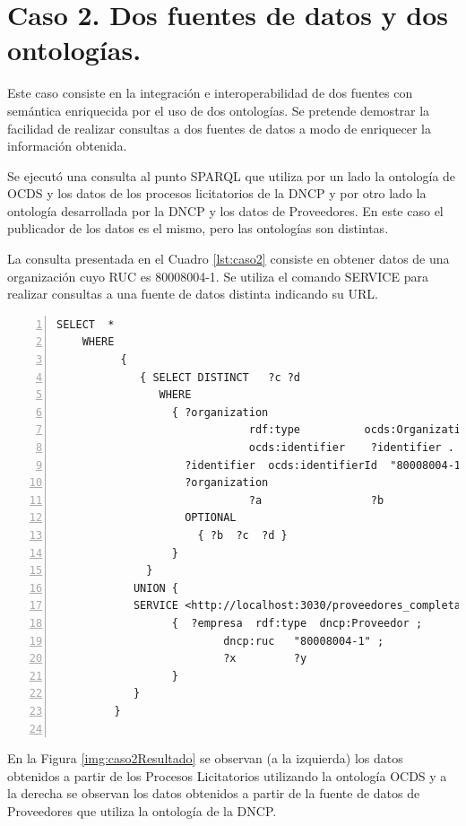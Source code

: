 \section{Caso 2. Dos fuentes de datos y dos ontologías.}


Este caso consiste en la integración e interoperabilidad de dos fuentes con semántica enriquecida por el uso de dos ontologías. Se pretende demostrar la facilidad de realizar consultas a dos fuentes de datos a modo de enriquecer la información obtenida.

Se ejecutó una consulta al punto SPARQL que utiliza por un lado la ontología de OCDS y los datos de los procesos licitatorios de la DNCP y por otro lado la ontología desarrollada por la DNCP y los datos de Proveedores. En este caso el publicador de los datos es el mismo, pero las ontologías son distintas.

La consulta presentada en el Cuadro \ref{lst:caso2} consiste en obtener datos de una organización cuyo RUC es 80008004-1. Se utiliza el comando SERVICE para realizar consultas a una fuente de datos distinta indicando su URL.

\noindent\begin{minipage}[c]{\textwidth}
\begin{lstlisting}[captionpos=b, caption={Consulta a dos fuentes de de datos}, label={lst:caso2},  numbers=left,  numberstyle=\tiny\color{mygray},frame=single]
SELECT  *
    WHERE
          {   
             { SELECT DISTINCT   ?c ?d
                WHERE
                  { ?organization
                              rdf:type          ocds:Organization ;
                              ocds:identifier    ?identifier .
                    ?identifier  ocds:identifierId  "80008004-1" .
                    ?organization
                              ?a                 ?b
                    OPTIONAL
                      { ?b  ?c  ?d }
                  }
              }
            UNION {
            SERVICE <http://localhost:3030/proveedores_completas_no_inf/sparql>
                  {  ?empresa  rdf:type  dncp:Proveedor ;
                          dncp:ruc   "80008004-1" ;
                          ?x         ?y
                  }
            }
         }
    
 \end{lstlisting}
\end{minipage}

 En la Figura \ref{img:caso2Resultado} se observan (a la izquierda) los datos obtenidos a partir de los Procesos Licitatorios utilizando la ontología OCDS y a la derecha se observan los datos obtenidos a partir de la fuente de datos de Proveedores que utiliza la ontología de la DNCP.



